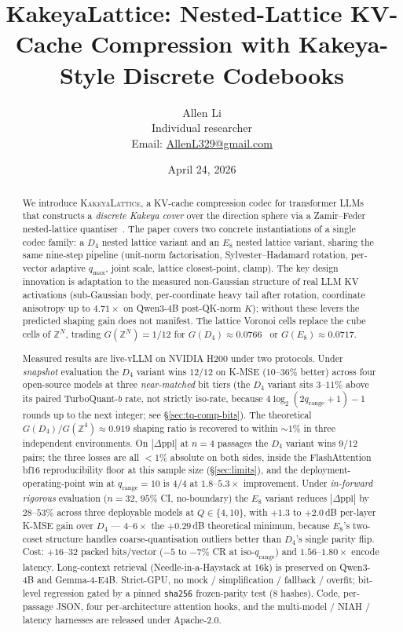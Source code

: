 \documentclass[10pt,a4paper]{article}
\title{\textbf{KakeyaLattice: Nested-Lattice KV-Cache Compression
with Kakeya-Style Discrete Codebooks}}
\author{Allen Li \\[2pt]
  \small Individual researcher \\
  \small Email: \href{mailto:AllenL329@gmail.com}{AllenL329@gmail.com}}
\date{April 24, 2026}
\theoremstyle{definition}
\theoremstyle{plain}
\newcommand{\Z}{\mathbb{Z}}
\begin{document}
\maketitle

\begin{abstract}
We introduce \textsc{KakeyaLattice}, a KV-cache compression codec
for transformer LLMs that constructs a \emph{discrete Kakeya
cover} over the direction sphere via a Zamir--Feder nested-lattice
quantiser~\cite{zamir-feder}. The paper covers two concrete
instantiations of a single codec family: a $D_4$ nested lattice
variant and an $E_8$ nested lattice variant, sharing the same
nine-step pipeline (unit-norm factorisation, Sylvester--Hadamard
rotation, per-vector adaptive $q_\mathrm{max}$, joint scale,
lattice closest-point, clamp). The key design innovation is
adaptation to the measured non-Gaussian structure of real LLM KV
activations (sub-Gaussian body, per-coordinate heavy tail after
rotation, coordinate anisotropy up to $4.71\times$ on Qwen3-4B
post-QK-norm $K$); without these levers the predicted shaping
gain does not manifest. The lattice Voronoi cells replace the
cube cells of $\Z^N$, trading $G(\Z^N)=1/12$ for
$G(D_4)\approx 0.0766$~\cite{conway-sloane-book} or
$G(E_8)\approx 0.0717$.

Measured results are live-vLLM on NVIDIA H200 under two protocols.
Under \emph{snapshot} evaluation the $D_4$ variant wins $12/12$
on K-MSE ($10$--$36\%$ better) across four open-source models at
three \emph{near-matched} bit tiers (the $D_4$ variant sits
$3$--$11\%$ above its paired TurboQuant-$b$ rate, not strictly
iso-rate, because $4\log_2(2q_\mathrm{range}+1)-1$ rounds up to
the next integer; see \S\ref{sec:tq-comp-bits}). The theoretical
$G(D_4)/G(\Z^4)\approx 0.919$ shaping ratio is recovered to
within $\sim\!1\%$ in three independent environments. On
$|\Delta\mathrm{ppl}|$ at $n=4$ passages the $D_4$ variant wins
$9/12$ pairs; the three losses are all $<\!1\%$ absolute on both
sides, inside the FlashAttention bf16 reproducibility floor at
this sample size (\S\ref{sec:limits}), and the
deployment-operating-point win at $q_\mathrm{range}=10$ is
$4/4$ at $1.8$--$5.3\times$ improvement.
Under \emph{in-forward rigorous} evaluation ($n=32$, $95\%$ CI,
no-boundary) the $E_8$ variant reduces
$|\Delta\mathrm{ppl}|$ by $28$--$53\%$ across three deployable
models at $Q\in\{4,10\}$, with $+1.3$ to $+2.0\,$dB per-layer
K-MSE gain over $D_4$ --- $4$--$6\times$ the $+0.29\,$dB
theoretical minimum, because $E_8$'s two-coset structure handles
coarse-quantisation outliers better than $D_4$'s single parity
flip. Cost: $+16$--$32$ packed bits/vector ($-5$ to $-7\%$ CR at
iso-$q_\mathrm{range}$) and $1.56$--$1.80\times$ encode latency.
Long-context retrieval (Needle-in-a-Haystack at $16$k) is
preserved on Qwen3-4B and Gemma-4-E4B.
Strict-GPU, no mock / simplification / fallback / overfit;
bit-level regression gated by a pinned \texttt{sha256}
frozen-parity test ($8$ hashes). Code, per-passage JSON, four
per-architecture attention hooks, and the multi-model / NIAH /
latency harnesses are released under Apache-2.0.
\end{abstract}
\end{document}
